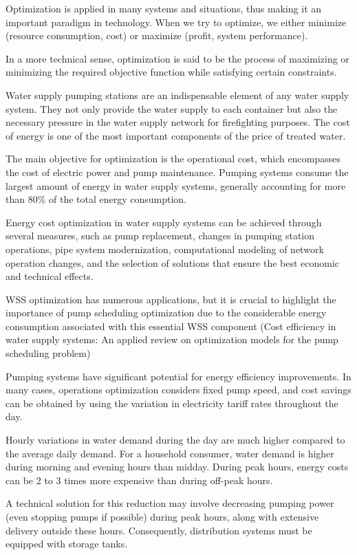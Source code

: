 Optimization is applied in many systems and situations, thus making it an important paradigm in technology. When we try to optimize, we either minimize (resource consumption, cost) or maximize (profit, system performance)\cite{rfc19}.


In a more technical sense, optimization is said to be the process of maximizing or minimizing the required objective function while satisfying certain constraints.\cite{rfc21}

Water supply pumping stations are an indispensable element of any water supply system. They not only provide the water supply to each container but also the necessary pressure in the water supply network for firefighting purposes. The cost of energy is one of the most important components of the price of treated water.\cite{rfc7}

The main objective for optimization is the operational cost, which encompasses the cost of electric power and pump maintenance.\cite{rfc2} Pumping systems consume the largest amount of energy in water supply systems, generally accounting for more than 80\% of the total energy consumption.\cite{rfc8}

Energy cost optimization in water supply systems can be achieved through several measures, such as pump replacement, changes in pumping station operations, pipe system modernization, computational modeling of network operation changes, and the selection of solutions that ensure the best economic and technical effects.\cite{rfc7}

WSS optimization has numerous applications, but it is crucial to highlight the importance of pump scheduling optimization due to the considerable energy consumption associated with this essential WSS component (Cost efficiency in water supply systems: An applied review on optimization models for the pump scheduling problem)

Pumping systems have significant potential for energy efficiency improvements. In many cases, operations optimization considers fixed pump speed, and cost savings can be obtained by using the variation in electricity tariff rates throughout the day.\cite{rfc8}

Hourly variations in water demand during the day are much higher compared to the average daily demand. For a household consumer, water demand is higher during morning and evening hours than midday. During peak hours, energy costs can be 2 to 3 times more expensive than during off-peak hours.

A technical solution for this reduction may involve decreasing pumping power (even stopping pumps if possible) during peak hours, along with extensive delivery outside these hours. Consequently, distribution systems must be equipped with storage tanks.



